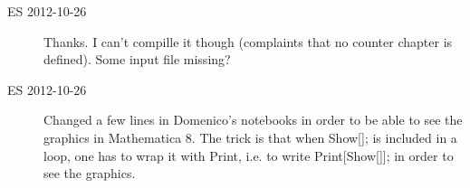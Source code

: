 \begin{description}
\item[ES 2012-10-26] Thanks. I can't compille it though (complaints that no counter chapter is defined). 
Some input file missing?

\item[ES 2012-10-26] Changed a few lines in Domenico's notebooks in order to be able
to see the graphics in Mathematica 8. The trick is that when Show[]; is included in a loop,
one has to wrap it with Print, i.e. to write Print[Show[]]; in order to see the graphics.




\end{description}
